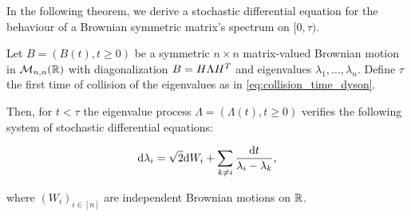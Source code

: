 In the following theorem, we derive a stochastic differential equation for the behaviour of a Brownian symmetric matrix's spectrum on $[0,\tau)$.

\begin{theorem} \label{thm:dyson_real}
    Let $B = (B(t), t \ge 0)$ be a symmetric $n\times n$ matrix-valued Brownian motion in $\mathcal M_{n,n}(\mathbb R)$ with diagonalization $B = H \Lambda H^T$ and eigenvalues $\lambda_1, \dots, \lambda_n$. Define $\tau$ the first time of collision of the eigenvalues as in \eqref{eq:collision_time_dyson}.
    
    Then, for $t < \tau$ the eigenvalue process $\Lambda = (\Lambda(t), t\ge 0)$ verifies the following system of stochastic differential equations:

    \begin{equation}
        \mathrm d \lambda_i = \sqrt{2}\mathrm d W_i + \sum_{k\neq i} \frac{\mathrm d t}{\lambda_i - \lambda_k}, 
    \end{equation}

    \noindent where $(W_i)_{i\in[n]}$ are independent Brownian motions on $\mathbb R$.
\end{theorem}

